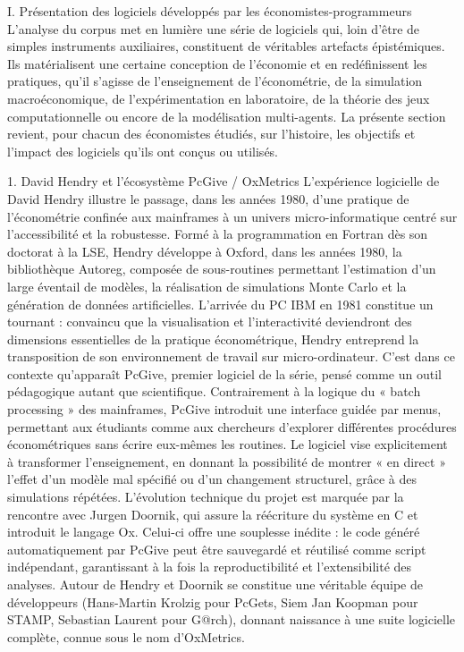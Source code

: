 

I. Présentation des logiciels développés par les économistes-programmeurs
L’analyse du corpus met en lumière une série de logiciels qui, loin d’être de simples instruments auxiliaires, constituent de véritables artefacts épistémiques. Ils matérialisent une certaine conception de l’économie et en redéfinissent les pratiques, qu’il s’agisse de l’enseignement de l’économétrie, de la simulation macroéconomique, de l’expérimentation en laboratoire, de la théorie des jeux computationnelle ou encore de la modélisation multi-agents. La présente section revient, pour chacun des économistes étudiés, sur l’histoire, les objectifs et l’impact des logiciels qu’ils ont conçus ou utilisés.

1. David Hendry et l’écosystème PcGive / OxMetrics
L’expérience logicielle de David Hendry illustre le passage, dans les années 1980, d’une pratique de l’économétrie confinée aux mainframes à un univers micro-informatique centré sur l’accessibilité et la robustesse. Formé à la programmation en Fortran dès son doctorat à la LSE, Hendry développe à Oxford, dans les années 1980, la bibliothèque Autoreg, composée de sous-routines permettant l’estimation d’un large éventail de modèles, la réalisation de simulations Monte Carlo et la génération de données artificielles. L’arrivée du PC IBM en 1981 constitue un tournant : convaincu que la visualisation et l’interactivité deviendront des dimensions essentielles de la pratique économétrique, Hendry entreprend la transposition de son environnement de travail sur micro-ordinateur.
C’est dans ce contexte qu’apparaît PcGive, premier logiciel de la série, pensé comme un outil pédagogique autant que scientifique. Contrairement à la logique du « batch processing » des mainframes, PcGive introduit une interface guidée par menus, permettant aux étudiants comme aux chercheurs d’explorer différentes procédures économétriques sans écrire eux-mêmes les routines. Le logiciel vise explicitement à transformer l’enseignement, en donnant la possibilité de montrer « en direct » l’effet d’un modèle mal spécifié ou d’un changement structurel, grâce à des simulations répétées.
L’évolution technique du projet est marquée par la rencontre avec Jurgen Doornik, qui assure la réécriture du système en C et introduit le langage Ox. Celui-ci offre une souplesse inédite : le code généré automatiquement par PcGive peut être sauvegardé et réutilisé comme script indépendant, garantissant à la fois la reproductibilité et l’extensibilité des analyses. Autour de Hendry et Doornik se constitue une véritable équipe de développeurs (Hans-Martin Krolzig pour PcGets, Siem Jan Koopman pour STAMP, Sebastian Laurent pour G@rch), donnant naissance à une suite logicielle complète, connue sous le nom d’OxMetrics.
